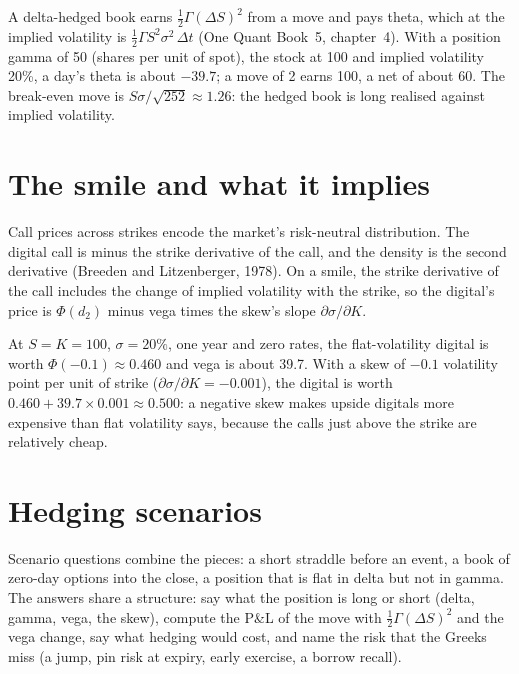 \begin{example}\label{ex:iv:options-and-derivatives:pnl}
A delta-hedged book earns $\tfrac12\Gamma(\Delta S)^2$ from a move and pays theta, which at the implied volatility is
$\tfrac12\Gamma S^2\sigma^2\,\Delta t$ (One Quant Book~5, chapter~4). With a position gamma of 50 (shares per unit of
spot), the stock at 100 and implied volatility 20\%, a day's theta is about $-39.7$; a move of 2 earns 100, a net of about
60. The break-even move is $S\sigma/\sqrt{252} \approx 1.26$: the hedged book is long realised against implied
volatility.
\end{example}

\section{The smile and what it implies}

Call prices across strikes encode the market's risk-neutral distribution. The digital call is minus the strike
derivative of the call, and the density is the second derivative (Breeden and Litzenberger, 1978). On a smile, the strike
derivative of the call includes the change of implied volatility with the strike, so the digital's price is $\Phi(d_2)$
minus vega times the skew's slope $\partial\sigma/\partial K$.

\begin{example}\label{ex:iv:options-and-derivatives:digital}
At $S = K = 100$, $\sigma = 20\%$, one year and zero rates, the flat-volatility digital is worth $\Phi(-0.1) \approx 0.460$
and vega is about 39.7. With a skew of $-0.1$ volatility point per unit of strike ($\partial\sigma/\partial K = -0.001$), the
digital is worth $0.460 + 39.7 \times 0.001 \approx 0.500$: a negative skew makes upside digitals more expensive than flat
volatility says, because the calls just above the strike are relatively cheap.
\end{example}

\section{Hedging scenarios}

Scenario questions combine the pieces: a short straddle before an event, a book of zero-day options into the close, a
position that is flat in delta but not in gamma. The answers share a structure: say what the position is long or short
(delta, gamma, vega, the skew), compute the P\&L of the move with $\tfrac12\Gamma(\Delta S)^2$ and the vega change, say
what hedging would cost, and name the risk that the Greeks miss (a jump, pin risk at expiry, early exercise, a borrow
recall).

